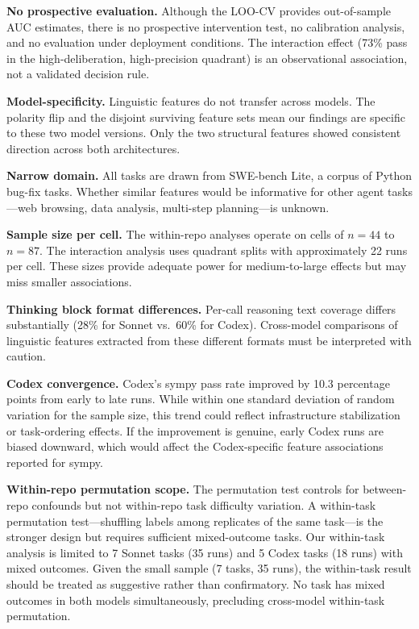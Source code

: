 \documentclass[11pt]{article}
\begin{document}
\textbf{No prospective evaluation.}
Although the LOO-CV provides out-of-sample AUC estimates, there is no prospective intervention test, no calibration analysis, and no evaluation under deployment conditions.
The interaction effect (73\% pass in the high-deliberation, high-precision quadrant) is an observational association, not a validated decision rule.

\textbf{Model-specificity.}
Linguistic features do not transfer across models.
The polarity flip and the disjoint surviving feature sets mean our findings are specific to these two model versions.
Only the two structural features showed consistent direction across both architectures.

\textbf{Narrow domain.}
All tasks are drawn from SWE-bench Lite, a corpus of Python bug-fix tasks.
Whether similar features would be informative for other agent tasks---web browsing, data analysis, multi-step planning---is unknown.

\textbf{Sample size per cell.}
The within-repo analyses operate on cells of $n = 44$ to $n = 87$.
The interaction analysis uses quadrant splits with approximately 22 runs per cell.
These sizes provide adequate power for medium-to-large effects but may miss smaller associations.

\textbf{Thinking block format differences.}
Per-call reasoning text coverage differs substantially (28\% for Sonnet vs.\ 60\% for Codex).
Cross-model comparisons of linguistic features extracted from these different formats must be interpreted with caution.

\textbf{Codex convergence.}
Codex's sympy pass rate improved by 10.3 percentage points from early to late runs.
While within one standard deviation of random variation for the sample size, this trend could reflect infrastructure stabilization or task-ordering effects.
If the improvement is genuine, early Codex runs are biased downward, which would affect the Codex-specific feature associations reported for sympy.

\textbf{Within-repo permutation scope.}
The permutation test controls for between-repo confounds but not within-repo task difficulty variation.
A within-task permutation test---shuffling labels among replicates of the same task---is the stronger design but requires sufficient mixed-outcome tasks.
Our within-task analysis is limited to 7 Sonnet tasks (35 runs) and 5 Codex tasks (18 runs) with mixed outcomes.
Given the small sample (7 tasks, 35 runs), the within-task result should be treated as suggestive rather than confirmatory.
No task has mixed outcomes in both models simultaneously, precluding cross-model within-task permutation.
\end{document}
